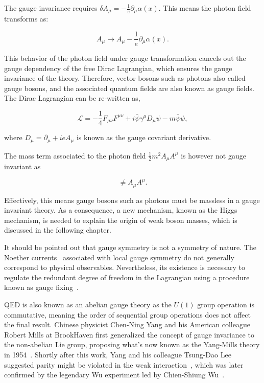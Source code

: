 The gauge invariance requires $\delta A_{\mu}=-\frac{1}{e}\partial_{\mu}\alpha(x)$. This means the photon field transforms as:

\begin{equation}
A_{\mu}\rightarrow A_{\mu}-\frac{1}{e}\partial_{\mu}\alpha(x).
\end{equation}

This behavior of the photon field under gauge transformation cancels out the gauge dependency of the free Dirac Lagrangian, which ensures the gauge invariance of the theory. Therefore, vector bosons such as photons also called gauge bosons, and the associated quantum fields are also known as gauge fields. The Dirac Lagrangian can be re-written as,

\begin{equation}
\label{eq:QEDCov}
\mathcal{L}=-\frac{1}{4}F_{\mu\nu}F^{\mu\nu}+i\bar{\psi}\gamma^{\mu}D_{\mu}\psi-m\bar{\psi}\psi,
\end{equation}

where $D_{\mu}=\partial_{\mu}+ieA_{\mu}$ is known as the gauge covariant derivative. 

The mass term associated to the photon field $\frac{1}{2}m^2A_{\mu}A^{\mu}$ is however not gauge invariant as

\begin{equation}
[A_{\mu}-\frac{1}{e}\partial_{\mu}\alpha(x)][A^{\mu}-\frac{1}{e}\partial^{\mu}\alpha(x)]\neq A_{\mu}A^{\mu}.
\end{equation}

Effectively, this means gauge bosons such as photons must be massless in a gauge invariant theory. As a consequence, a new mechanism, known as the Higgs mechanism, is needed to explain the origin of weak boson masses, which is discussed in the following chapter. 

It should be pointed out that gauge symmetry is not a symmetry of nature. The Noether currents~\cite{Noether1918} associated with local gauge symmetry do not generally correspond to physical observables. Nevertheless, its existence is necessary to regulate the redundant degree of freedom in the Lagrangian using a procedure known as gauge fixing~\cite{SCHWARTZ}. 

\ac{QED} is also known as an abelian gauge theory as the $U(1)$ group operation is commutative, meaning the order of sequential group operations does not affect the final result. Chinese physicist Chen-Ning Yang and his American colleague Robert Mills at BrookHaven first generalized the concept of gauge invariance to the non-abelian Lie group, proposing what's now known as the Yang-Mills theory in 1954~\cite{Yang:1954ek}. Shortly after this work, Yang and his colleague Tsung-Dao Lee suggested parity might be violated in the weak interaction~\cite{Lee:1956qn}, which was later confirmed by the legendary Wu experiment led by Chien-Shiung Wu~\cite{Wu:1957my}. 

